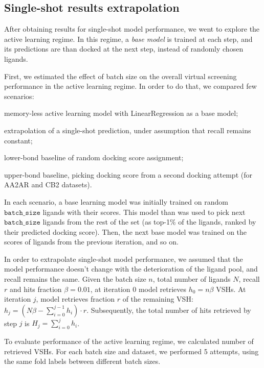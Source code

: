 \subsection{Single-shot results extrapolation}

After obtaining results for single-shot model performance, we went to explore the active learning regime. In this regime, a \textit{base model} is trained at each step, and its predictions are than docked at the next step, instead of randomly chosen ligands. 

First, we estimated the effect of batch size on the overall virtual screening performance in the active learning regime. In order to do that, we compared few scenarios: 
\begin{enumerate*}[label=(\roman*)]
    \item memory-less active learning model with LinearRegression as a base model;
    \item extrapolation of a single-shot prediction, under assumption that recall remains constant;
    \item lower-bond baseline of random docking score assignment;
    \item upper-bond baseline, picking docking score from a second docking attempt (for AA2AR and CB2 datasets).
\end{enumerate*}

In each scenario, a base learning model was initially trained on random $\texttt{batch\_size}$ ligands with their scores. This model than was used to pick next $\texttt{batch\_size}$ ligands from the rest of the set (as top-1\% of the ligands, ranked by their predicted docking score). Then, the next base model was trained on the scores of ligands from the previous iteration, and so on.

In order to extrapolate single-shot model performance, we assumed that the model performance doesn't change with the deterioration of the ligand pool, and recall remains the same. Given the batch size $n$, total number of ligands $N$, recall $r$ and hits fraction $\beta=0.01$, at iteration 0 model retrieves $h_0 = n\beta$ VSHs. At iteration $j$, model retrieves fraction $r$ of the remaining VSH: $h_j = ( N\beta - \sum_{i=0}^{j-1}h_i ) \cdot r$. Subsequently, the total number of hits retrieved by step $j$ is $H_j = \sum_{i=0}^{j} h_i$.

To evaluate performance of the active learning regime, we calculated number of retrieved VSHs. For each batch size and dataset, we performed 5 attempts, using the same fold labels between different batch sizes.

